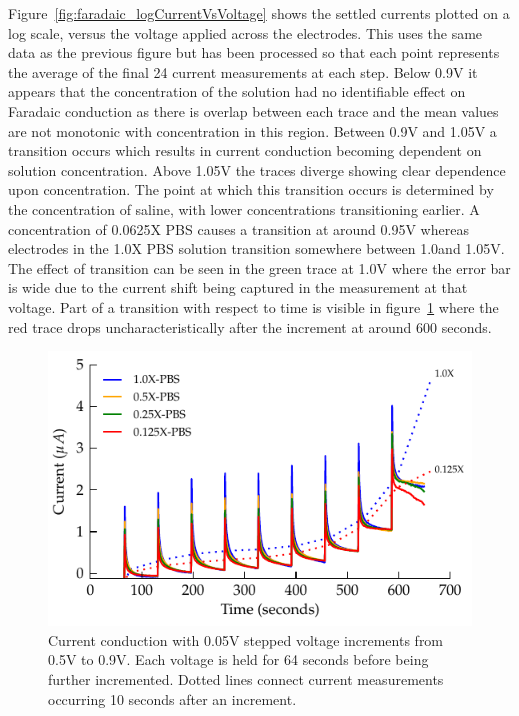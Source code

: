 \documentclass[journal, a4paper]{IEEEtran}
\begin{document}
Figure~\ref{fig:faradaic_logCurrentVsVoltage} shows the settled currents plotted on a log scale, versus the voltage applied across the electrodes. This uses the same data as the previous figure but has been processed so that each point represents the average of the final 24 current measurements at each step. Below 0.9\thinspace V it appears that the concentration of the solution had no identifiable effect on Faradaic conduction {\color{blue}as there is overlap between each trace and the mean values are not monotonic with concentration in this region}.  Between 0.9\thinspace V and 1.05\thinspace V a transition occurs which results in current conduction becoming dependent on solution concentration.
Above 1.05\thinspace V the traces diverge showing clear dependence upon concentration.
{\color{blue} The point at which this transition occurs is determined by the concentration of saline, with lower concentrations transitioning earlier. A concentration of 0.0625X PBS causes a transition at around 0.95\thinspace V whereas electrodes in the 1.0X PBS solution transition somewhere between 1.0\thinspace and 1.05\thinspace V. The effect of transition can be seen in the green trace at 1.0\thinspace V where the error bar is wide due to the current shift being captured in the measurement at that voltage. Part of a transition with respect to time is visible in figure~\ref{fig:StepResponse_Faradaic} where the red trace drops uncharacteristically after the increment at around 600 seconds.}

\begin{figure}
    \begin{center}
        \includegraphics{graphics/currentTimeFaradaicCPE_Stacked_IEEE}
    \end{center}
    \caption{Current conduction with 0.05\thinspace V stepped voltage increments from 0.5\thinspace V to 0.9V. Each voltage is held for 64 seconds before being further incremented. Dotted lines connect current measurements occurring 10 seconds after an increment.}
    \label{fig:StepResponse_Faradaic}
\end{figure}
\end{document}
